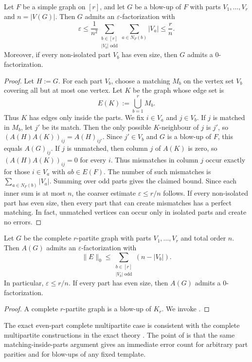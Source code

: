 \documentclass{file}
\newcommand{\eps}{\varepsilon}
\begin{document}
\begin{thm}
\label{thm:blowup-factor}
Let $F$ be a simple graph on $[r]$, and let $G$ be a blow-up of $F$ with parts $V_1,\dots,V_r$ and $n=|V(G)|$.  
Then $G$ admits an $\eps$-factorization with
\[
  \eps
  \le
  \frac{1}{n^2}
  \sum_{\substack{b\in[r]\\ |V_b|\text{ odd}}}
  \sum_{a\in N_F(b)}|V_a|
  \le
  \frac{r}{n}.
\]
Moreover, if every non-isolated part $V_b$ has even size, then $G$ admits a $0$-factorization.
\end{thm}

\begin{proof}
Let $H:=G$.  For each part $V_b$, choose a matching $M_b$ on the vertex set
$V_b$ covering all but at most one vertex.  Let $K$ be the graph whose edge set
is
\[
  E(K):=\bigcup_{b=1}^r M_b.
\]
Thus $K$ has edges only inside the parts.
We fix $i\in V_a$ and $j\in V_b$.  
If $j$ is matched in $M_b$, let $j'$ be its match.  
Then the only possible $K$-neighbour of $j$ is $j'$, so
$(A(H)A(K))_{ij}=A(H)_{ij'}$.
Since $j'\in V_b$ and $G$ is a blow-up of $F$, this equals $A(G)_{ij}$.
If $j$ is unmatched, then column $j$ of $A(K)$ is zero, so
$(A(H)A(K))_{ij}=0$ for every $i$.  
Thus mismatches in column $j$ occur exactly for those
$i\in V_a$ with $ab\in E(F)$.  
The number of such mismatches is $\sum_{a\in N_F(b)}|V_a|$.
Summing over odd parts gives the claimed bound.  Since each inner sum is at most $n$, the coarser estimate $\eps\le r/n$ follows.  
If every non-isolated part has even size, then every part that can create mismatches has a perfect matching. 
In fact, unmatched vertices can occur only in isolated parts and create no errors.
\end{proof}

\begin{cor}
\label{cor:complete-multipartite}
Let $G$ be the complete $r$-partite graph with parts $V_1,\dots,V_r$ and total
order $n$.  Then $A(G)$ admits an $\eps$-factorization with
\[
  \|E\|_0
  \le
  \sum_{\substack{b\in[r]\\ |V_b|\text{ odd}}}(n-|V_b|).
\]
In particular, $\eps\le r/n$.  If every part has even size, then $A(G)$ admits
a $0$-factorization.
\end{cor}

\begin{proof}
A complete $r$-partite graph is a blow-up of $K_r$.  
We invoke .
\end{proof}

\begin{rem}
The exact even-part complete multipartite case is consistent with the complete
multipartite constructions in the exact theory \cite{maghsoudi2023matrix}.  The
point of  is that the same matching-inside-parts
argument gives an immediate error count for arbitrary part parities and for
blow-ups of any fixed template.
\end{rem}
\end{document}
